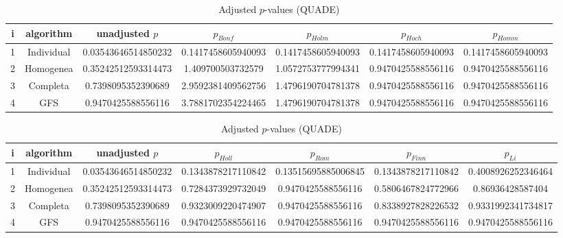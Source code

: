 \documentclass[a4paper,10pt]{article}
\begin{document}
\begin{landscape}
\newpage

\begin{table}[!htp]
\centering\scriptsize
\caption{Adjusted $p$-values (QUADE)}
\begin{tabular}{ccccccc}
i&algorithm&unadjusted $p$&$p_{Bonf}$&$p_{Holm}$&$p_{Hoch}$&$p_{Homm}$\\
\hline
1&Individual&0.03543646514850232&0.1417458605940093&0.1417458605940093&0.1417458605940093&0.1417458605940093\\
2&Homogenea&0.35242512593314473&1.409700503732579&1.0572753777994341&0.9470425588556116&0.9470425588556116\\
3&Completa&0.7398095352390689&2.9592381409562756&1.4796190704781378&0.9470425588556116&0.9470425588556116\\
4&GFS&0.9470425588556116&3.7881702354224465&1.4796190704781378&0.9470425588556116&0.9470425588556116\\
\hline
\end{tabular}
\end{table}

\begin{table}[!htp]
\centering\scriptsize
\caption{Adjusted $p$-values (QUADE)}
\begin{tabular}{ccccccc}
i&algorithm&unadjusted $p$&$p_{Holl}$&$p_{Rom}$&$p_{Finn}$&$p_{Li}$\\
\hline
1&Individual&0.03543646514850232&0.1343878217110842&0.13515695885006845&0.1343878217110842&0.4008926252346464\\
2&Homogenea&0.35242512593314473&0.7284373929732049&0.9470425588556116&0.5806467824772966&0.86936428587404\\
3&Completa&0.7398095352390689&0.9323009220474907&0.9470425588556116&0.8338927828226532&0.9331992341734817\\
4&GFS&0.9470425588556116&0.9470425588556116&0.9470425588556116&0.9470425588556116&0.9470425588556116\\
\hline
\end{tabular}
\end{table}

\end{landscape}
\end{document}
